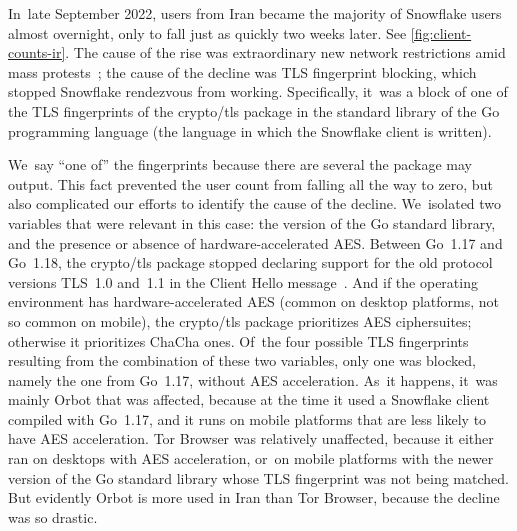 \documentclass[letterpaper,twocolumn]{article}
\begin{document}
In~late September 2022,
users from Iran became the majority of Snowflake users almost overnight,
only to fall just as quickly two weeks later.
See \autoref{fig:client-counts-ir}.
The cause of the rise was
extraordinary new network restrictions amid mass protests~\cite{ooni-2022-iran-blocks-social-media-mahsa-amini-protests};
the cause of the decline was TLS fingerprint blocking,
which stopped Snowflake rendezvous from working.
Specifically, it~was a block of one of the TLS fingerprints
of the crypto/tls package in the standard library of
the Go programming language
(the language in which the Snowflake client is written).

We~say ``one of'' the fingerprints
because there are several the package may output.
This fact prevented the user count from falling all the way to zero,
but also complicated our efforts to identify the cause of the decline.
We~isolated two variables that were relevant in this case:
the version of the Go standard library,
and the presence or absence of hardware-accelerated AES.
Between Go~1.17 and Go~1.18,
the crypto/tls package stopped declaring support
for the old protocol versions TLS~1.0 and~1.1
in the Client Hello message~\cite{go1.18-tls10}.
And if the operating environment has hardware-accelerated AES
(common on desktop platforms, not so common on mobile),
the crypto/tls package prioritizes AES ciphersuites;
otherwise it prioritizes ChaCha ones.
Of~the four possible TLS fingerprints
resulting from the combination of these two variables,
only one was blocked,
namely the one from Go~1.17, without AES acceleration.
As~it happens, it~was mainly Orbot that was affected,
because at the time it used a Snowflake client compiled with Go~1.17,
and it runs on mobile platforms that are less likely to have AES acceleration.
Tor Browser was relatively unaffected,
because it either ran on desktops with AES acceleration,
or~on mobile platforms with the newer version of the Go
standard library whose TLS fingerprint was not being matched.
But evidently Orbot is more used in Iran than Tor Browser,
because the decline was so drastic.
\end{document}
